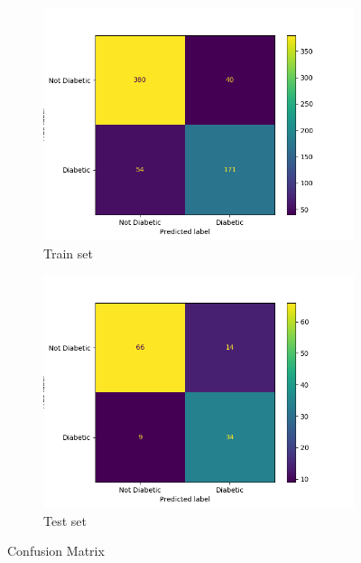 \documentclass[11pt,a4paper]{article}
\begin{document}
\begin{figure}[htbp]
\begin{subfigure}{\columnwidth}
  \centering
  \includegraphics[width=\columnwidth,keepaspectratio]{cf_train-epoch1000.png}  
  \caption{Train set}
  \label{fig:cf:test}
\end{subfigure}
\begin{subfigure}{\columnwidth}
  \centering
  \includegraphics[width=\columnwidth,keepaspectratio]{cf_test-epoch1000.png}
  \caption{Test set}
  \label{fig:cf:train}
\end{subfigure}
\caption{Confusion Matrix}
\label{fig:cf}
\end{figure}
\end{document}
